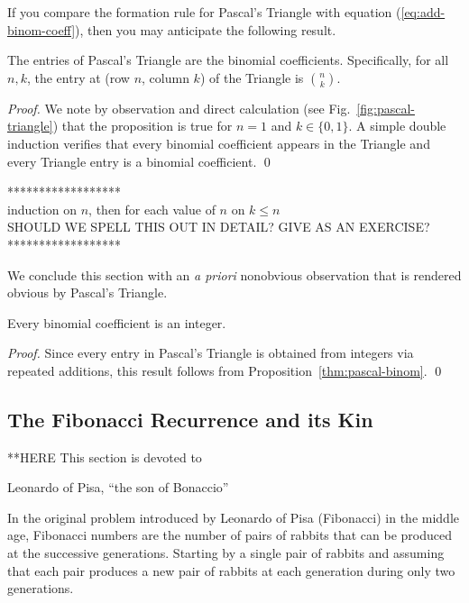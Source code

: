 \smallskip

If you compare the formation rule for Pascal's Triangle with equation
(\ref{eq:add-binom-coeff}), then you may anticipate the following
result.

\begin{prop}
\label{thm:pascal-binom}
The entries of Pascal's Triangle are the binomial coefficients.
Specifically, for all $n,k$, the entry at (row $n$, column $k$) of the
Triangle is $\displaystyle {n \choose k}$.
\end{prop}

\begin{proof}
We note by observation and direct calculation (see
Fig.~\ref{fig:pascal-triangle}) that the proposition is true for $n =
1$ and $k \in \{0, 1\}$.  A simple double induction verifies that
every binomial coefficient appears in the Triangle and every Triangle
entry is a binomial coefficient.  \qed
\end{proof}

\noindent
****************** \\
induction on $n$, then for each value of $n$ on $k \leq n$ \\
{\Arny SHOULD WE SPELL THIS OUT IN DETAIL?  GIVE AS AN EXERCISE?} \\
******************

\smallskip

We conclude this section with an {\it a priori} nonobvious observation
that is rendered obvious by Pascal's Triangle.

\begin{prop}
\label{thm:binomcoeff-integer}
Every binomial coefficient is an integer.
\end{prop}

\begin{proof}
Since every entry in Pascal's Triangle is obtained from integers via
repeated additions, this result follows from
Proposition~\ref{thm:pascal-binom}.  \qed
\end{proof}


\subsection{The Fibonacci Recurrence and its Kin}
\label{sec:Fiboacci-plus}

**HERE
This section is devoted to 

Leonardo of Pisa, ``the son of Bonaccio''

In the original problem introduced by Leonardo of Pisa (Fibonacci) in the middle age, 
Fibonacci numbers are the number of pairs of rabbits that can be produced at the successive generations. 
Starting by a single pair of rabbits and assuming that each pair produces a new pair of rabbits 
at each generation during only two generations. 


